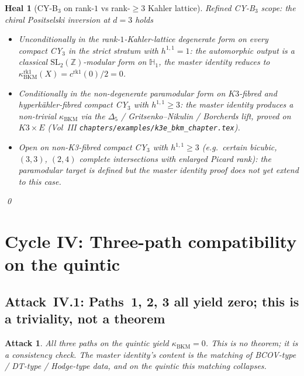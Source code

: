 \documentclass[11pt]{amsart}
\newtheorem{attack}[theorem]{Attack}
\newtheorem{heal}[theorem]{Heal}
\providecommand{\Z}{\mathbb{Z}}
\providecommand{\SL}{\mathrm{SL}}
\providecommand{\kBKM}{\kappa_{\mathrm{BKM}}}
\begin{document}
\begin{heal}[CY-B$_3$ on rank-$1$ vs rank-$\geq 3$ Kahler lattice]
\label{heal:cy-b3-rank-1-vs-3}
Refined CY-B$_3$ scope: the chiral Positselski inversion at $d = 3$
holds
\begin{itemize}
\item \emph{Unconditionally} in the rank-$1$-Kahler-lattice
degenerate form on every compact CY$_3$ in the strict stratum with
$h^{1,1} = 1$: the automorphic output is a classical
$\SL_2(\Z)$-modular form on $\mathbb{H}_1$, the master identity
reduces to $\kBKM^{\mathrm{rk}1}(X) = c^{\mathrm{rk}1}(0)/2 = 0$.
\item \emph{Conditionally} in the non-degenerate paramodular form
on $K3$-fibred and hyperk\"ahler-fibred compact CY$_3$ with
$h^{1,1} \geq 3$: the master identity produces a non-trivial
$\kBKM$ via the $\Delta_5$ / Gritsenko--Nikulin / Borcherds lift,
\emph{proved on $K3 \times E$} (Vol~III
\texttt{chapters/examples/k3e\_bkm\_chapter.tex}).
\item \emph{Open} on non-K3-fibred compact CY$_3$ with
$h^{1,1} \geq 3$ (e.g.\ certain bicubic, $(3,3)$, $(2,4)$
complete intersections with enlarged Picard rank): the paramodular
target is defined but the master identity proof does not yet
extend to this case.
\end{itemize}
\qed
\end{heal}

\section{Cycle IV: Three-path compatibility on the quintic}
\label{sec:cycle-4-compatibility}

\subsection{Attack~IV.1: Paths~1, 2, 3 all yield zero; this is a
triviality, not a theorem}

\begin{attack}
\label{att:triviality-of-zero}
All three paths on the quintic yield $\kBKM = 0$. This is no theorem;
it is a consistency check. The master identity's content is the
matching of BCOV-type / DT-type / Hodge-type data, and on the
quintic this matching collapses.
\end{attack}
\end{document}
